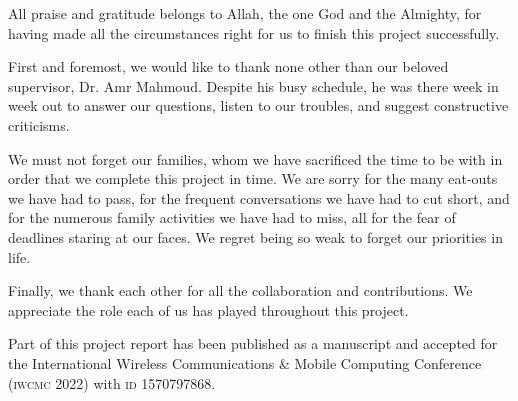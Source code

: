 \documentclass[../main.tex]{subfiles}
\begin{document}

All praise and gratitude belongs to Allah, the one God 
and the Almighty, for having made all the circumstances 
right for us to finish this project successfully.

First and foremost, we would like to thank none other than
our beloved supervisor, Dr. Amr Mahmoud. Despite his busy
schedule, he was there
week in week out to answer our questions, listen to our
troubles, and suggest constructive criticisms. 

We must not forget our families, whom we have sacrificed 
the time to be with in order that we complete this project
in time. We are
sorry for the many eat-outs we have had to pass, 
for the frequent conversations we have had to cut short,
and for the numerous family activities we have had to miss,
all for the fear of deadlines staring at our faces.
We regret being so weak to forget our priorities in life.

Finally, we thank each other for all the collaboration
and contributions. We appreciate the role each of us
has played throughout this project.

Part of this project report has been published as a manuscript and
accepted for the International Wireless Communications \& Mobile
Computing Conference (\textsc{iwcmc} 2022) with \textsc{id} 1570797868.
\end{document}
